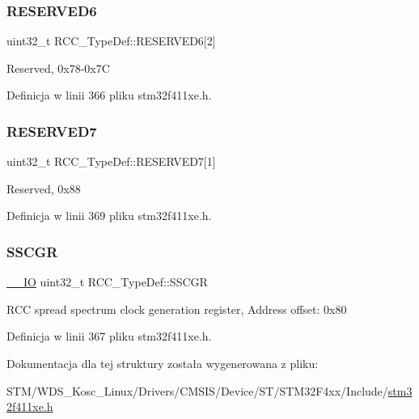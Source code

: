 \subsubsection{\texorpdfstring{R\+E\+S\+E\+R\+V\+E\+D6}{RESERVED6}}
{\footnotesize\ttfamily uint32\+\_\+t R\+C\+C\+\_\+\+Type\+Def\+::\+R\+E\+S\+E\+R\+V\+E\+D6\mbox{[}2\mbox{]}}

Reserved, 0x78-\/0x7C 

Definicja w linii 366 pliku stm32f411xe.\+h.

\mbox{\label{struct_r_c_c___type_def_abcd04be226dcaaa5a329998927f54222}} 
\subsubsection{\texorpdfstring{R\+E\+S\+E\+R\+V\+E\+D7}{RESERVED7}}
{\footnotesize\ttfamily uint32\+\_\+t R\+C\+C\+\_\+\+Type\+Def\+::\+R\+E\+S\+E\+R\+V\+E\+D7\mbox{[}1\mbox{]}}

Reserved, 0x88 

Definicja w linii 369 pliku stm32f411xe.\+h.

\mbox{\label{struct_r_c_c___type_def_a52270ad1423c68cd536f62657bb669f5}} 
\subsubsection{\texorpdfstring{S\+S\+C\+GR}{SSCGR}}
{\footnotesize\ttfamily \hyperlink{core__sc300_8h_aec43007d9998a0a0e01faede4133d6be}{\+\_\+\+\_\+\+IO} uint32\+\_\+t R\+C\+C\+\_\+\+Type\+Def\+::\+S\+S\+C\+GR}

R\+CC spread spectrum clock generation register, Address offset\+: 0x80 

Definicja w linii 367 pliku stm32f411xe.\+h.



Dokumentacja dla tej struktury została wygenerowana z pliku\+:\begin{DoxyCompactItemize}
\item 
S\+T\+M/\+W\+D\+S\+\_\+\+Kosc\+\_\+\+Linux/\+Drivers/\+C\+M\+S\+I\+S/\+Device/\+S\+T/\+S\+T\+M32\+F4xx/\+Include/\hyperlink{stm32f411xe_8h}{stm32f411xe.\+h}\end{DoxyCompactItemize}
